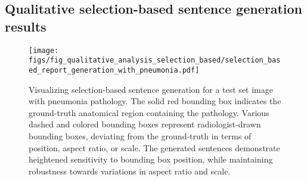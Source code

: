 \documentclass[10pt,twocolumn,letterpaper]{article}
\begin{document}
\subsection{Qualitative selection-based sentence generation results}
\begin{figure*}[ht!]
  \centering
   \texttt{[image: figs/fig\_qualitative\_analysis\_selection\_based/selection\_based\_report\_generation\_with\_pneumonia.pdf]}
   \caption{Visualizing selection-based sentence generation for a test set image with pneumonia pathology. The solid red bounding box indicates the ground-truth anatomical region containing the pathology. Various dashed and colored bounding boxes represent radiologist-drawn bounding boxes, deviating from the ground-truth in terms of position, aspect ratio, or scale. The generated sentences demonstrate heightened sensitivity to bounding box position, while maintaining robustness towards variations in aspect ratio and scale.}
   \label{fig:qualitative_analysis_selection_based}
\end{figure*}
\FloatBarrier
\end{document}
